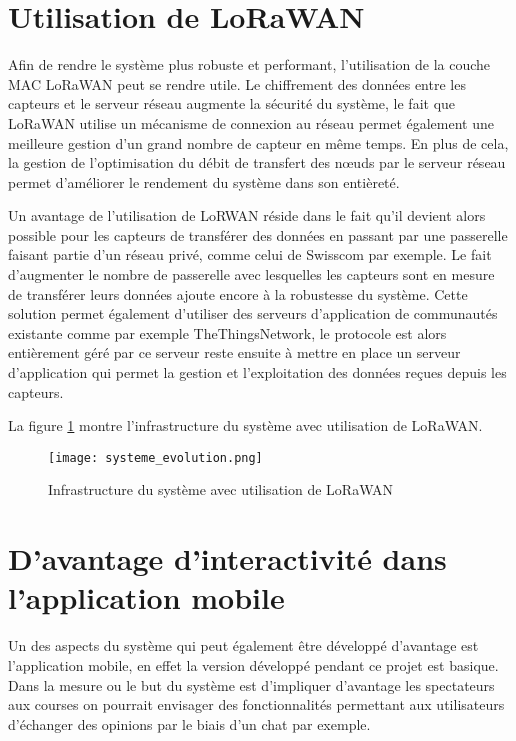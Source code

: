 \section{Utilisation de LoRaWAN}

Afin de rendre le système plus robuste et performant, l'utilisation de la couche MAC LoRaWAN peut se rendre utile. Le chiffrement des données entre les capteurs et le serveur réseau augmente la sécurité du système, le fait que LoRaWAN utilise un mécanisme de connexion au réseau permet également une meilleure gestion d'un grand nombre de capteur en même temps. En plus de cela, la gestion de l'optimisation du débit de transfert des nœuds par le serveur réseau permet d'améliorer le rendement du système dans son entièreté.

Un avantage de l'utilisation de LoRWAN réside dans le fait qu'il devient alors possible pour les capteurs de transférer des données en passant par une passerelle faisant partie d'un réseau privé, comme celui de Swisscom par exemple. Le fait d'augmenter le nombre de passerelle avec lesquelles les capteurs sont en mesure de transférer leurs données ajoute encore à la robustesse du système. Cette solution permet également d'utiliser des serveurs d'application de communautés existante comme par exemple TheThingsNetwork, le protocole est alors entièrement géré par ce serveur reste ensuite à mettre en place un serveur d'application qui permet la gestion et l'exploitation des données reçues depuis les capteurs.

La figure \ref{fig:sys_infra_evol} montre l'infrastructure du système avec utilisation de LoRaWAN.

\begin{figure}[tb]
\centering 
\texttt{[image: systeme\_evolution.png]} 
\caption{Infrastructure du système avec utilisation de LoRaWAN}
\label{fig:sys_infra_evol}
\end{figure}

\section{D'avantage d'interactivité dans l'application mobile}

Un des aspects du système qui peut également être développé d'avantage est l'application mobile, en effet la version développé pendant ce projet est basique. Dans la mesure ou le but du système est d'impliquer d'avantage les spectateurs aux courses on pourrait envisager des fonctionnalités permettant aux utilisateurs d'échanger des opinions par le biais d'un chat par exemple. 

